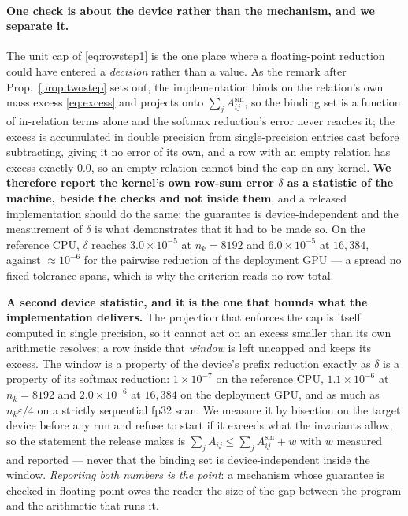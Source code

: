 \documentclass{article}
\begin{document}
\paragraph{One check is about the device rather than the mechanism, and we separate it.} The unit
cap of \eqref{eq:rowstep1} is the one place where a floating-point reduction could have entered a
\emph{decision} rather than a value. As the remark after Prop.~\ref{prop:twostep} sets out, the
implementation binds on the relation's own mass excess \eqref{eq:excess} and projects onto
$\sum_jA^{\mathrm{sm}}_{ij}$, so the binding set is a function of in-relation terms alone and the
softmax reduction's error never reaches it; the excess is accumulated in double precision from
single-precision entries cast before subtracting, giving it no error of its own, and a row with an
empty relation has excess exactly $0.0$, so an empty relation cannot bind the cap on any kernel.
\textbf{We therefore report the kernel's own row-sum error $\delta$ as a statistic of the machine,
beside the checks and not inside them}, and a released implementation should do the same: the
guarantee is device-independent and the measurement of $\delta$ is what demonstrates that it had
to be made so. On the reference CPU, $\delta$ reaches $3.0\times10^{-5}$ at $n_k=8192$ and
$6.0\times10^{-5}$ at $16{,}384$, against $\approx10^{-6}$ for the pairwise reduction of the
deployment GPU --- a spread no fixed tolerance spans, which is why the criterion reads no row
total.

\textbf{A second device statistic, and it is the one that bounds what the implementation
delivers.} The projection that enforces the cap is itself computed in single precision, so it
cannot act on an excess smaller than its own arithmetic resolves; a row inside that
\emph{window} is left uncapped and keeps its excess. The window is a property of the device's
prefix reduction exactly as $\delta$ is a property of its softmax reduction: $1\times10^{-7}$ on
the reference CPU, $1.1\times10^{-6}$ at $n_k=8192$ and $2.0\times10^{-6}$ at $16{,}384$ on the
deployment GPU, and as much as $n_k\varepsilon/4$ on a strictly sequential fp32 scan. We measure
it by bisection on the target device before any run and refuse to start if it exceeds what the
invariants allow, so the statement the release makes is
$\sum_jA_{ij}\le\sum_jA^{\mathrm{sm}}_{ij}+w$ with $w$ measured and reported --- never that the
binding set is device-independent inside the window. \emph{Reporting both numbers is the point}:
a mechanism whose guarantee is checked in floating point owes the reader the size of the gap
between the program and the arithmetic that runs it.
\end{document}
